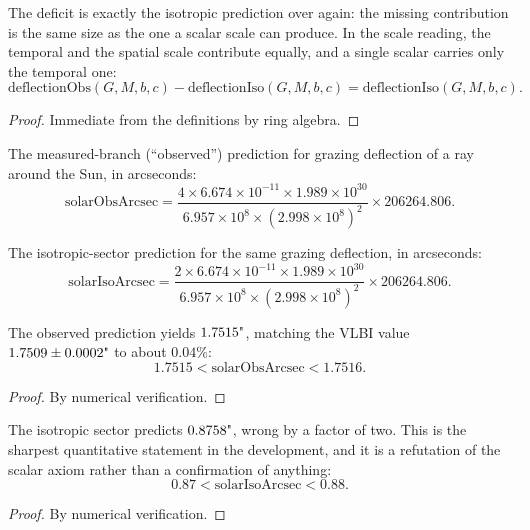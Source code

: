 \begin{theorem}
The deficit is exactly the isotropic prediction over again: the missing contribution is the same size as the one a scalar scale can produce. In the scale reading, the temporal and the spatial scale contribute equally, and a single scalar carries only the temporal one:
\[
\text{deflectionObs}(G, M, b, c) - \text{deflectionIso}(G, M, b, c) = \text{deflectionIso}(G, M, b, c).
\]
\begin{proof}
Immediate from the definitions by ring algebra.
\end{proof}
\end{theorem}

\begin{definition}
The measured-branch (``observed'') prediction for grazing deflection of a ray around the Sun, in arcseconds:
\[
\text{solarObsArcsec} = \frac{4 \times 6.674 \times 10^{-11} \times 1.989 \times 10^{30}}{6.957 \times 10^8 \times (2.998 \times 10^8)^2} \times 206264.806.
\]
\end{definition}

\begin{definition}
The isotropic-sector prediction for the same grazing deflection, in arcseconds:
\[
\text{solarIsoArcsec} = \frac{2 \times 6.674 \times 10^{-11} \times 1.989 \times 10^{30}}{6.957 \times 10^8 \times (2.998 \times 10^8)^2} \times 206264.806.
\]
\end{definition}

\begin{theorem}
The observed prediction yields $1.7515 \text{\textquotedbl}$, matching the VLBI value $1.7509 \pm 0.0002 \text{\textquotedbl}$ to about $0.04\%$:
\[
1.7515 < \text{solarObsArcsec} < 1.7516.
\]
\begin{proof}
By numerical verification.
\end{proof}
\end{theorem}

\begin{theorem}
The isotropic sector predicts $0.8758 \text{\textquotedbl}$, wrong by a factor of two. This is the sharpest quantitative statement in the development, and it is a refutation of the scalar axiom rather than a confirmation of anything:
\[
0.87 < \text{solarIsoArcsec} < 0.88.
\]
\begin{proof}
By numerical verification.
\end{proof}
\end{theorem}

